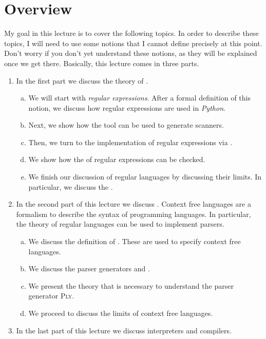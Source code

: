 \section{Overview}
My goal in this lecture is to cover the following topics.  In order to describe these topics, I will need to
use some notions that I cannot define precisely at this point.  Don't worry if you don't yet understand these 
notions, as they will be explained once we get there.  Basically, this lecture comes in three parts.
\begin{enumerate}
\item In the first part we discuss the theory of .
  \begin{enumerate}[(a)]
  \item We will start with \emph{regular expressions}.  After a formal definition of this notion,
        we discuss how regular expressions are used in \textsl{Python}.
  \item Next, we show how the tool  can be used to generate scanners.
  \item Then, we turn to the implementation of regular expressions via .
  \item We show how the  of regular expressions can be checked.
  \item We finish our discussion of regular languages by discussing their limits.
        In particular, we discuss the . 
  \end{enumerate}
\item In the second part of this lecture we discuss .
      Context free languages are a formalism to describe the syntax of programming languages.
      In particular, the theory of regular languages can be used to implement parsers.
      \begin{enumerate}[(a)]
      \item We discuss the definition of .  These are used to specify 
            context free languages.  
      \item We discuss the parser generators  and .
      \item We present the theory that is necessary to understand the parser generator \textsc{Ply}.
      \item We proceed to discuss the limits of context free languages.
      \end{enumerate}
\item In the last part of this lecture we discuss interpreters and compilers.
\end{enumerate}


